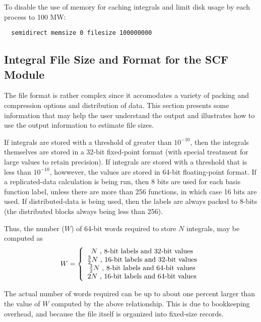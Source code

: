 To disable the use of memory for caching integrals and limit disk
usage by each process to 100 MW:
\begin{verbatim}
  semidirect memsize 0 filesize 100000000
\end{verbatim}


\subsection{Integral File Size and Format for the SCF Module}

The file format is rather complex since it accomodates a variety of
packing and compression options and distribution of data.  This
section presents some information that may help the user understand
the output and illustrates how to use the output information to
estimate file sizes.

If integrals are stored with a threshold of greater than $10^{-10}$,
then the integrals themselves are stored in a 32-bit fixed-point
format (with special treatment for large values to retain precision).
If integrals are stored with a threshold that is less than $10^{-10}$,
howwever, the values are stored in 64-bit floating-point format.  If a
replicated-data calculation is being run, then 8 bits are used for
each basis function label, unless there are more than 256 functions,
in which case 16 bits are used.  If distributed-data is being used,
then the labels are always packed to 8-bits (the distributed blocks
always being less than 256).

Thus, the number ($W$) of 64-bit words required to store $N$
integrals, may be computed as
\begin{displaymath}
  W = \left\{ \\
      \begin{array}{c}
        N \mbox{ , 8-bit labels and 32-bit values} \\
        \frac{3}{2}N \mbox{ , 16-bit labels and 32-bit values} \\
        \frac{3}{2}N \mbox{ , 8-bit labels and 64-bit values} \\
        2N \mbox{ , 16-bit labels and 64-bit values} 
      \end{array}
      \right.
\end{displaymath}

The actual number of words required can be up to about one percent
larger than the value of $W$ computed by the above relationship.  This
is due to bookkeeping overhead, and because the file itself is
organized into fixed-size records.

